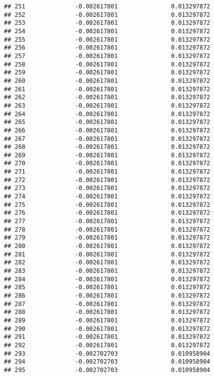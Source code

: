 \documentclass[]{article}
\begin{document}
\begin{verbatim}
## 251              -0.002617801               0.013297872
## 252              -0.002617801               0.013297872
## 253              -0.002617801               0.013297872
## 254              -0.002617801               0.013297872
## 255              -0.002617801               0.013297872
## 256              -0.002617801               0.013297872
## 257              -0.002617801               0.013297872
## 258              -0.002617801               0.013297872
## 259              -0.002617801               0.013297872
## 260              -0.002617801               0.013297872
## 261              -0.002617801               0.013297872
## 262              -0.002617801               0.013297872
## 263              -0.002617801               0.013297872
## 264              -0.002617801               0.013297872
## 265              -0.002617801               0.013297872
## 266              -0.002617801               0.013297872
## 267              -0.002617801               0.013297872
## 268              -0.002617801               0.013297872
## 269              -0.002617801               0.013297872
## 270              -0.002617801               0.013297872
## 271              -0.002617801               0.013297872
## 272              -0.002617801               0.013297872
## 273              -0.002617801               0.013297872
## 274              -0.002617801               0.013297872
## 275              -0.002617801               0.013297872
## 276              -0.002617801               0.013297872
## 277              -0.002617801               0.013297872
## 278              -0.002617801               0.013297872
## 279              -0.002617801               0.013297872
## 280              -0.002617801               0.013297872
## 281              -0.002617801               0.013297872
## 282              -0.002617801               0.013297872
## 283              -0.002617801               0.013297872
## 284              -0.002617801               0.013297872
## 285              -0.002617801               0.013297872
## 286              -0.002617801               0.013297872
## 287              -0.002617801               0.013297872
## 288              -0.002617801               0.013297872
## 289              -0.002617801               0.013297872
## 290              -0.002617801               0.013297872
## 291              -0.002617801               0.013297872
## 292              -0.002617801               0.013297872
## 293              -0.002702703               0.010958904
## 294              -0.002702703               0.010958904
## 295              -0.002702703               0.010958904

\end{verbatim}
\end{document}
